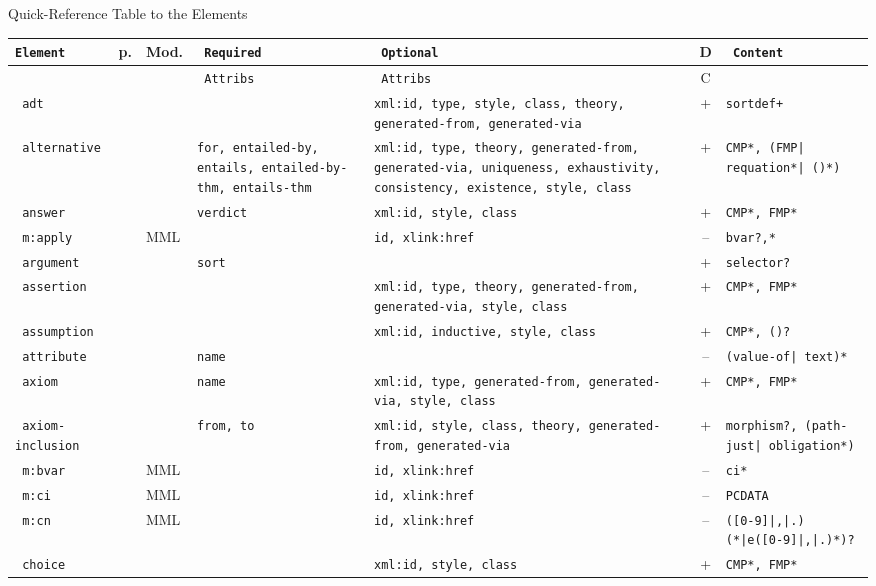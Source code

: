 
\begin{tchapter}[id=table,short=Quick-Reference]{Quick-Reference Table to the {\omdoc} Elements}
\def\tabelt#1#2#3#4#5#6{{#1}&\pageref{eldef:#1}&{#2}&{#3}&{#4}&{#5}&{#6}\\\hline}
\def\mathmlcat{MML}\def\omcat{OM}
 {\scriptsize\begin{longtable}{|>{\tt}p{1.8cm}|l|l|>{\tt}p{1.8cm}|>{\tt}p{1.8cm}|c|>{\tt}p{2.2cm}|}\hline
{\rm Element}& p. & Mod.  & {\rm Required}  & {\rm Optional} & D & Content \\\hline
             & &        & {\rm Attribs}  & {\rm Attribs} & C &        \\\hline\hline
\tabelt{adt}{\ADTmodule{spec}}{}{xml:id, type, style, class, theory, generated-from, generated-via}{+}{sortdef+}
\tabelt{alternative}{\STmodule{spec}}{for, entailed-by, entails,
             entailed-by-thm, entails-thm}{xml:id, type, theory,
  generated-from, generated-via, uniqueness, exhaustivity, consistency, existence,
             style, class}{+}{CMP*, (FMP| requation*| ({\mobjabbr})*)}
\tabelt{answer}{\QUIZmodule{spec}}{verdict}{xml:id, style, class}{+}{CMP*, FMP*}
\tabelt{m:apply}\mathmlcat{}{id, xlink:href}{--}{bvar?,\llquote{CMel}*}
\tabelt{argument}{\ADTmodule{spec}}{sort}{}{+}{selector?}
\tabelt{assertion}{\STmodule{spec}}{}{xml:id, type, theory,
  generated-from, generated-via, style, class}{+}{CMP*, FMP*}
\tabelt{assumption}{\MTXTmodule{spec}}{}{xml:id, inductive, style, class}{+}{CMP*, (\mobjabbr)?}
\tabelt{attribute}{\PRESmodule{spec}}{name}{}{--}{(value-of| text)*}
\tabelt{axiom}{\STmodule{spec}}{name}{xml:id, type, generated-from, generated-via, style, class}{+}{CMP*, FMP*}
\tabelt{axiom-inclusion}{\CTHmodule{spec}}{from, to}{xml:id, style, class, theory,
  generated-from, generated-via}{+}{morphism?, (path-just| obligation*)}\hline
\tabelt{m:bvar}\mathmlcat{}{id, xlink:href}{--}{ci*}
\tabelt{m:ci}\mathmlcat{}{id, xlink:href}{--}{PCDATA}
\tabelt{m:cn}\mathmlcat{}{id, xlink:href}{--}{([0-9]|,|.) (*|e([0-9]|,|.)*)?}
\tabelt{choice}{\QUIZmodule{spec}}{}{xml:id, style, class}{+}{CMP*, FMP*}

\end{longtable}}
\end{tchapter}
